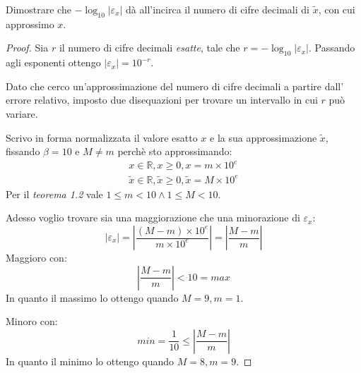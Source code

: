 \begin{exercise}
Dimostrare che $-\log_{10}{|\varepsilon_{x}|}$ d\`a all'incirca il numero 
di cifre decimali di $\tilde{x}$, con cui approssimo $x$. 
\end{exercise}
\begin{proof}
Sia $r$ il numero di cifre decimali \emph{esatte}, tale che 
$r = -\log_{10}{|\varepsilon_{x}|}$. Passando agli esponenti ottengo 
$|\varepsilon_{x}| = 10^{-r}$.

Dato che cerco un'approssimazione del numero di cifre decimali a partire dall'
errore relativo, imposto due disequazioni per trovare un intervallo in cui $r$
pu\`o variare.

Scrivo in forma normalizzata il valore esatto $x$ e la sua approssimazione 
$\tilde{x}$, fissando $\beta = 10$ e $M \not = m$ perch\`e sto approssimando:
\begin{equation*}
	\begin{split}
		x \in \mathbb{R}, x \geq 0, x = m \times 10^{e} \\
		\tilde{x} \in \mathbb{R}, \tilde{x} \geq 0, \tilde{x} = M \times 10^{e}
	\end{split}
\end{equation*}
Per il \emph{teorema 1.2} vale $ 1 \leq m < 10 \wedge  1 \leq M < 10$.

Adesso voglio trovare sia una maggiorazione che una minorazione di 
$\varepsilon_{x}$:
\begin{equation*}
	\left | \varepsilon_{x} \right | = \left | \frac{(M - m) \times 10^{e}} 
		{m \times 10^{e}}
	\right | = \left | \frac{M - m}{m} \right |
\end{equation*}
Maggioro con:
\begin{equation*}
	\left | \frac{M - m}{m} \right | < 10 = max
\end{equation*}
In quanto il massimo lo ottengo quando $M = 9, m = 1$.

Minoro con:
\begin{equation*}
	min = \frac{1}{10} \le \left | \frac{M - m}{m} \right | 
\end{equation*}
In quanto il minimo lo ottengo quando $M = 8, m = 9$.


\end{proof}
